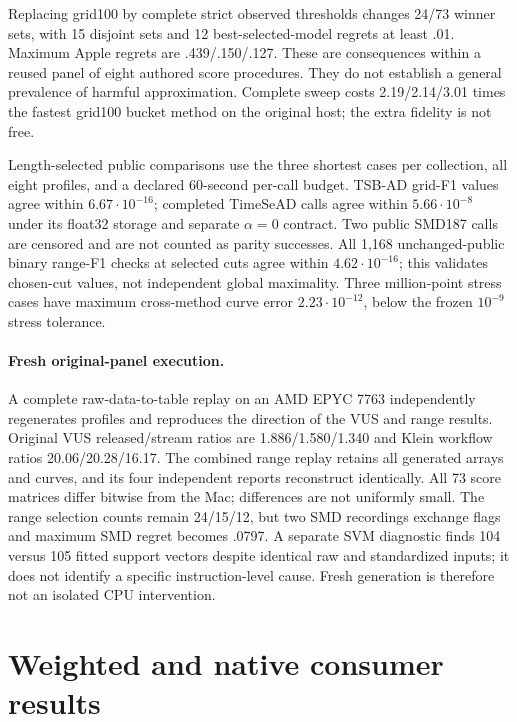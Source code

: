 Replacing grid100 by complete strict observed thresholds changes 24/73 winner
sets, with 15 disjoint sets and 12 best-selected-model regrets at least .01.
Maximum Apple regrets are .439/.150/.127. These are consequences within a
reused panel of eight authored score procedures. They do not establish a
general prevalence of harmful approximation. Complete sweep costs
2.19/2.14/3.01 times the fastest grid100 bucket method on the original host;
the extra fidelity is not free.

Length-selected public comparisons use the three shortest cases per collection,
all eight profiles, and a declared 60-second per-call budget. TSB-AD grid-F1
values agree within $6.67\cdot10^{-16}$; completed TimeSeAD calls agree within
$5.66\cdot10^{-8}$ under its float32 storage and separate $\alpha=0$ contract.
Two public SMD187 calls are censored and are not counted as parity successes.
All 1,168 unchanged-public binary range-F1 checks at selected cuts agree within
$4.62\cdot10^{-16}$; this validates chosen-cut values, not independent global
maximality. Three million-point stress cases have maximum cross-method curve
error $2.23\cdot10^{-12}$, below the frozen $10^{-9}$ stress tolerance.

\paragraph{Fresh original-panel execution.}
A complete raw-data-to-table replay on an AMD EPYC 7763 independently
regenerates profiles and reproduces the direction of the VUS and range results.
Original VUS released/stream ratios are 1.886/1.580/1.340 and Klein workflow
ratios 20.06/20.28/16.17. The combined range replay retains all generated
arrays and curves, and its four independent reports reconstruct identically.
All 73 score matrices differ bitwise from the Mac; differences are not
uniformly small. The range selection counts remain 24/15/12, but two SMD
recordings exchange flags and maximum SMD regret becomes .0797. A separate SVM
diagnostic finds 104 versus 105 fitted support vectors despite identical raw
and standardized inputs; it does not identify a specific instruction-level
cause. Fresh generation is therefore not an isolated CPU intervention.

\section{Weighted and native consumer results}


